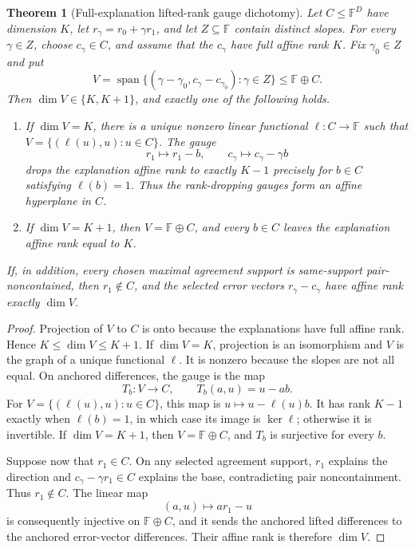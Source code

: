 \documentclass[11pt,a4paper]{amsart}
\numberwithin{equation}{section}
\newtheorem{theorem}{Theorem}[section]
\theoremstyle{remark}
\newcommand{\F}{\mathbb F}\newcommand{\B}{\mathbb B}\newcommand{\K}{\mathbb K}\newcommand{\Z}{\mathbb Z}
\begin{document}
\begin{theorem}[Full-explanation lifted-rank gauge dichotomy]
\label{thm:full-explanation-lifted-rank-dichotomy}
Let \(C\leq\F^D\) have dimension \(K\), let
\(r_\gamma=r_0+\gamma r_1\), and let \(Z\subseteq\F\) contain distinct
slopes.  For every \(\gamma\in Z\), choose \(c_\gamma\in C\), and assume
that the \(c_\gamma\) have full affine rank \(K\).  Fix
\(\gamma_0\in Z\) and put
\[
 V=\operatorname{span}\{(\gamma-\gamma_0,
                 c_\gamma-c_{\gamma_0}):\gamma\in Z\}
       \leq \F\oplus C.
\]
Then \(\dim V\in\{K,K+1\}\), and exactly one of the following holds.
\begin{enumerate}
\item If \(\dim V=K\), there is a unique nonzero linear functional
  \(\ell:C\to\F\) such that
  \(V=\{(\ell(u),u):u\in C\}\).  The gauge
  \[
     r_1\longmapsto r_1-b,
     \qquad c_\gamma\longmapsto c_\gamma-\gamma b
  \]
  drops the explanation affine rank to exactly \(K-1\) precisely for
  \(b\in C\) satisfying \(\ell(b)=1\).  Thus the rank-dropping gauges form
  an affine hyperplane in \(C\).
\item If \(\dim V=K+1\), then \(V=\F\oplus C\), and every \(b\in C\)
  leaves the explanation affine rank equal to \(K\).
\end{enumerate}
If, in addition, every chosen maximal agreement support is same-support
pair-noncontained, then \(r_1\notin C\), and the selected error vectors
\(r_\gamma-c_\gamma\) have affine rank exactly \(\dim V\).
\end{theorem}

\begin{proof}
Projection of \(V\) to \(C\) is onto because the explanations have full
affine rank.  Hence \(K\leq\dim V\leq K+1\).  If \(\dim V=K\), projection
is an isomorphism and \(V\) is the graph of a unique functional \(\ell\).
It is nonzero because the slopes are not all equal.  On anchored
differences, the gauge is the map
\[
  T_b:V\longrightarrow C,\qquad T_b(a,u)=u-ab.
\]
For \(V=\{(\ell(u),u):u\in C\}\), this map is
\(u\mapsto u-\ell(u)b\).  It has rank \(K-1\) exactly when
\(\ell(b)=1\), in which case its image is \(\ker\ell\); otherwise it is
invertible.  If \(\dim V=K+1\), then \(V=\F\oplus C\), and \(T_b\) is
surjective for every \(b\).

Suppose now that \(r_1\in C\).  On any selected agreement support,
\(r_1\) explains the direction and \(c_\gamma-\gamma r_1\in C\) explains
the base, contradicting pair noncontainment.  Thus \(r_1\notin C\).  The
linear map
\[
  (a,u)\longmapsto ar_1-u
\]
is consequently injective on \(\F\oplus C\), and it sends the anchored
lifted differences to the anchored error-vector differences.  Their affine
rank is therefore \(\dim V\).
\end{proof}
\end{document}
